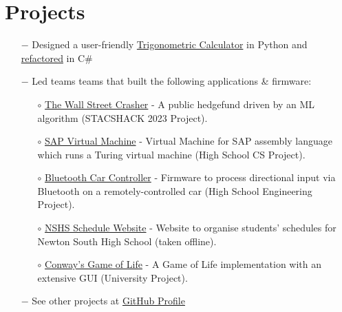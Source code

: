 \section{\textbf{Projects}}
\begin{itemize}
    \item[$-$] Designed a user-friendly \href{https://github.com/amylnikov30/AdvancedTrigCalc}{Trigonometric Calculator} in Python and \href{https://github.com/amylnikov30/TrigCalcv2.x}{refactored} in C\#
    
    
    \item[$-$] Led teams teams that built the following applications \& firmware: 
    \begin{itemize}
        \item[$\circ$] \href{https://github.com/James7304/the-wall-street-crashers}{The Wall Street Crasher} - A public hedgefund driven by an ML algorithm (STACSHACK 2023 Project).
        \item[$\circ$] \href{https://github.com/BerkUnver/SAP-Virtual-Machine}{SAP Virtual Machine} - Virtual Machine for SAP assembly language which runs a Turing virtual machine (High School CS Project).
        \item[$\circ$] \href{https://github.com/amylnikov30/BluetoothCarController}{Bluetooth Car Controller} - Firmware to process directional input via Bluetooth on a remotely-controlled car (High School Engineering Project).
        \item[$\circ$] \href{https://github.com/Sequal32/nshsschedule-website}{NSHS Schedule Website} - Website to organise students' schedules for Newton South High School (taken offline).
        \item[$\circ$] \href{https://github.com/James7304/game-of-life}{Conway's Game of Life} - A Game of Life implementation with an extensive GUI (University Project).
    \end{itemize}
    
    
    \item[$-$]  See other projects at {\href{https://github.com/amylnikov30}{GitHub Profile}}
\end{itemize}